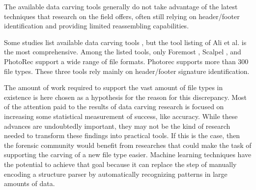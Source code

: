 \label{sec:data-carving-existing-tools}

The available data carving tools generally do not take advantage of the latest techniques that research on the field offers, often still relying on header/footer identification and providing limited reassembling capabilities.

Some studies list available data carving tools
\cite{ali_review_2018}
\cite{qiu_new_2014}
\cite{nadeem_ashraf_forensic_2013}
\cite{roux_reconstructing_2008}, 
but the tool listing of Ali et al. \cite{ali_review_2018} is the most comprehensive. Among the listed tools, only Foremost \cite{kendall_foremost_2019}, Scalpel \cite{richard_iii_scalpel:_2005}, and PhotoRec \cite{grenier_photorec_2019} support a wide range of file formats. Photorec supports more than 300 file types. These three tools rely mainly on header/footer signature identification.

The amount of work required to support the vast amount of file types in existence is here chosen as a hypothesis for the reason for this discrepancy. Most of the attention paid to the results of data carving research is focused on increasing some statistical measurement of success, like accuracy. While these advances are undoubtedly important, they may not be the kind of research needed to transform these findings into practical tools. If this is the case, then the forensic community would benefit from researches that could make the task of supporting the carving of a new file type easier. Machine learning techniques have the potential to achieve that goal because it can replace the step of manually encoding a structure parser by automatically recognizing patterns in large amounts of data.
